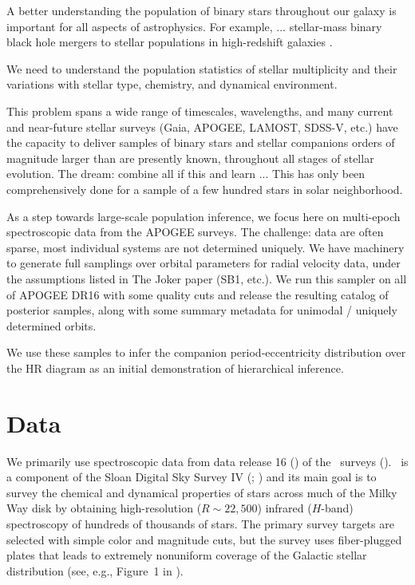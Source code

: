 \documentclass[modern]{aastex63}
\begin{document}
A better understanding the population of binary stars throughout our galaxy is important for all aspects of astrophysics. For example, ... stellar-mass binary black hole mergers to stellar populations in high-redshift galaxies \citep[e.g.,][]{Breivik:BAAS, Rix:BAAS}.

We need to understand the population statistics of stellar multiplicity and their variations with stellar type, chemistry, and dynamical environment.

This problem spans a wide range of timescales, wavelengths, and many current and near-future stellar surveys (Gaia, APOGEE, LAMOST, SDSS-V, etc.) have the capacity to deliver samples of binary stars and stellar companions orders of magnitude larger than are presently known, throughout all stages of stellar evolution.
The dream: combine all if this and learn ...
This has only been comprehensively done for a sample of a few hundred stars in solar neighborhood.

As a step towards large-scale population inference, we focus here on multi-epoch spectroscopic data from the APOGEE surveys.
The challenge: data are often sparse, most individual systems are not determined uniquely.
We have machinery to generate full samplings over orbital parameters for radial velocity data, under the assumptions listed in The Joker paper (SB1, etc.).
We run this sampler on all of APOGEE DR16 with some quality cuts and release the resulting catalog of posterior samples, along with some summary metadata for unimodal / uniquely determined orbits.

We use these samples to infer the companion period-eccentricity distribution over the HR diagram as an initial demonstration of hierarchical inference.


\section{Data} \label{sec:data}

We primarily use spectroscopic data from data release 16 () of the
\apogee\ surveys (\citealt{Majewski:2017, Abolfathi:2017, DR16}).
\apogee\ is a component of the Sloan Digital Sky Survey IV (\sdssiv;
\citealt{Gunn:2006, Blanton:2017}) and its main goal is to survey the chemical
and dynamical properties of stars across much of the Milky Way disk by obtaining
high-resolution ($R \sim 22,500$) infrared ($H$-band) spectroscopy of hundreds
of thousands of stars.
The primary survey targets are selected with simple color and magnitude cuts,
but the survey uses fiber-plugged plates that leads to extremely nonuniform
coverage of the Galactic stellar distribution (see, e.g., Figure~1 in
\citealt{DR16}).
\end{document}
